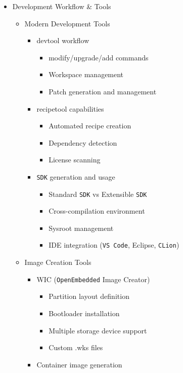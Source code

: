 \documentclass[
]{article}
\providecommand{\tightlist}{%
  \setlength{\itemsep}{0pt}\setlength{\parskip}{0pt}}
\begin{document}
\begin{itemize}
\tightlist
\item
  Development Workflow \& Tools

  \begin{itemize}
  \tightlist
  \item
    Modern Development Tools

    \begin{itemize}
    \tightlist
    \item
      devtool workflow

      \begin{itemize}
      \tightlist
      \item
        modify/upgrade/add commands
      \item
        Workspace management
      \item
        Patch generation and management
      \end{itemize}
    \item
      recipetool capabilities

      \begin{itemize}
      \tightlist
      \item
        Automated recipe creation
      \item
        Dependency detection
      \item
        License scanning
      \end{itemize}
    \item
      \texttt{SDK} generation and usage

      \begin{itemize}
      \tightlist
      \item
        Standard \texttt{SDK} vs Extensible \texttt{SDK}
      \item
        Cross-compilation environment
      \item
        Sysroot management
      \item
        IDE integration (\texttt{VS\ Code}, Eclipse, \texttt{CLion})
      \end{itemize}
    \end{itemize}
  \item
    Image Creation Tools

    \begin{itemize}
    \tightlist
    \item
      WIC (\texttt{OpenEmbedded} Image Creator)

      \begin{itemize}
      \tightlist
      \item
        Partition layout definition
      \item
        Bootloader installation
      \item
        Multiple storage device support
      \item
        Custom .wks files
      \end{itemize}
    \item
      Container image generation


\end{itemize}
\end{itemize}
\end{itemize}
\end{document}
